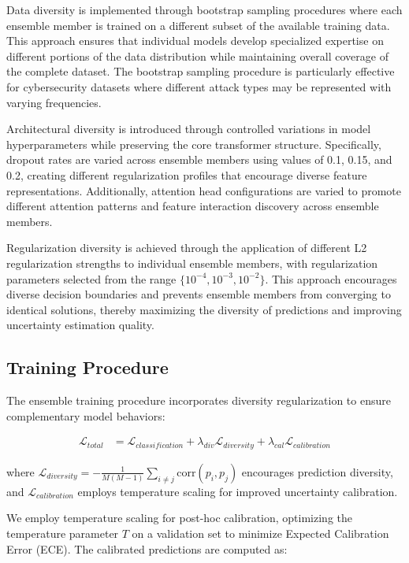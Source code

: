\documentclass[journal]{IEEEtran}
\begin{document}
Data diversity is implemented through bootstrap sampling procedures where each ensemble member is trained on a different subset of the available training data. This approach ensures that individual models develop specialized expertise on different portions of the data distribution while maintaining overall coverage of the complete dataset. The bootstrap sampling procedure is particularly effective for cybersecurity datasets where different attack types may be represented with varying frequencies.

Architectural diversity is introduced through controlled variations in model hyperparameters while preserving the core transformer structure. Specifically, dropout rates are varied across ensemble members using values of 0.1, 0.15, and 0.2, creating different regularization profiles that encourage diverse feature representations. Additionally, attention head configurations are varied to promote different attention patterns and feature interaction discovery across ensemble members.

Regularization diversity is achieved through the application of different L2 regularization strengths to individual ensemble members, with regularization parameters selected from the range $\{10^{-4}, 10^{-3}, 10^{-2}\}$. This approach encourages diverse decision boundaries and prevents ensemble members from converging to identical solutions, thereby maximizing the diversity of predictions and improving uncertainty estimation quality.

\subsection{Training Procedure}

The ensemble training procedure incorporates diversity regularization to ensure complementary model behaviors:

\begin{align}
\mathcal{L}_{total} &= \mathcal{L}_{classification} + \lambda_{div} \mathcal{L}_{diversity} + \lambda_{cal} \mathcal{L}_{calibration}
\end{align}

where $\mathcal{L}_{diversity} = -\frac{1}{M(M-1)} \sum_{i \neq j} \text{corr}(p_i, p_j)$ encourages prediction diversity, and $\mathcal{L}_{calibration}$ employs temperature scaling for improved uncertainty calibration.

We employ temperature scaling for post-hoc calibration, optimizing the temperature parameter $T$ on a validation set to minimize Expected Calibration Error (ECE). The calibrated predictions are computed as:
\end{document}
